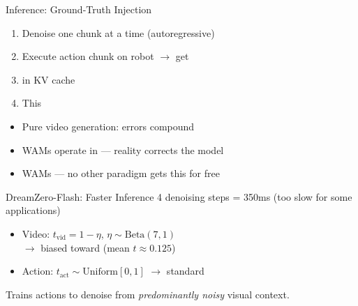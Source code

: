 \begin{frame}{Inference: Ground-Truth Injection}
\begin{keybox}
\begin{enumerate}
    \item Denoise one chunk at a time (autoregressive)
    \item Execute action chunk on robot
          $\rightarrow$ get 
    \item {}
          in KV cache
    \item This 
\end{enumerate}
\end{keybox}

\vspace{0.5em}
\begin{itemize}
    \item Pure video generation: errors compound
    \item WAMs operate in  ---
          reality corrects the model
    \item WAMs  ---
          no other paradigm gets this for free
\end{itemize}
\end{frame}

\begin{frame}{DreamZero-Flash: Faster Inference}
 4 denoising steps = 350ms
(too slow for some applications)

\vspace{0.5em}
 
\begin{itemize}
    \item Video: $t_{\text{vid}} = 1 - \eta$,
          $\eta \sim \text{Beta}(7,1)$\\
          $\rightarrow$ biased toward 
          (mean $t \approx 0.125$)
    \item Action: $t_{\text{act}} \sim \text{Uniform}[0,1]$
          $\rightarrow$ standard
\end{itemize}

\vspace{0.3em}
Trains actions to denoise from
\emph{predominantly noisy} visual context.
\end{frame}

